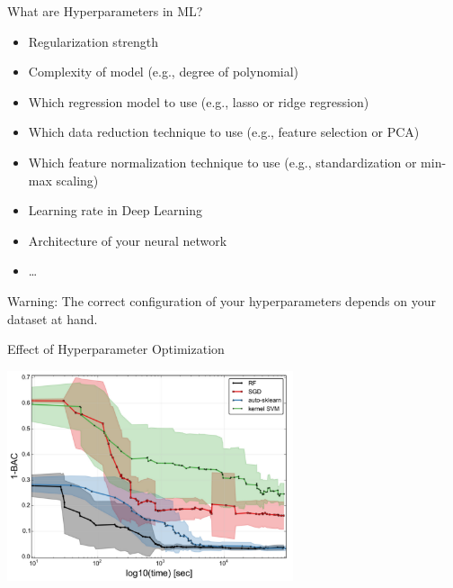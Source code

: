 \documentclass[aspectratio=169]{../latex_main/tntbeamer}  %
\begin{document}
\begin{frame}[c]{What are Hyperparameters in ML?}
	
	\begin{itemize}
	    \item Regularization strength
	    \item Complexity of model (e.g., degree of polynomial)
	    \smallskip
	    \item Which regression model to use (e.g., lasso or ridge regression)
	    \item Which data reduction technique to use (e.g., feature selection or PCA)
	    \item Which feature normalization technique to use (e.g., standardization or min-max scaling)
	    \smallskip
	    \item Learning rate in Deep Learning
	    \item Architecture of your neural network
	    \item \ldots
	\end{itemize}
	
	\bigskip
	\alert{Warning:} The correct configuration of your hyperparameters depends on your dataset at hand.
	
\end{frame}
\begin{frame}[c]{Effect of Hyperparameter Optimization}
	
	\centering
\includegraphics[width=0.63\textwidth]{09_cv_reg_auto/figure/image12.png}
	
\end{frame}
\end{document}
